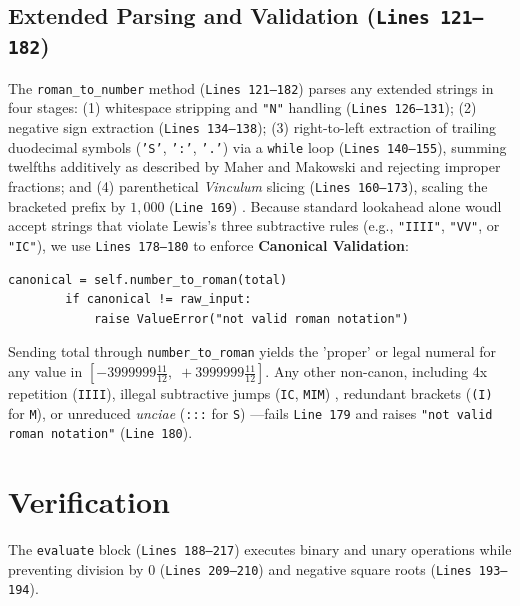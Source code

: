 \documentclass[10pt, a4paper]{article}
\begin{document}

\subsection{Extended Parsing and Validation (\texttt{Lines 121--182})}
The \texttt{roman\_to\_number} method (\texttt{Lines 121--182}) parses any extended strings in four stages: (1) whitespace stripping and \texttt{"N"} handling (\texttt{Lines 126--131}); (2) negative sign extraction (\texttt{Lines 134--138}); (3) right-to-left extraction of trailing duodecimal symbols (\texttt{'S'}, \texttt{':'}, \texttt{'.'}) via a \texttt{while} loop (\texttt{Lines 140--155}), summing twelfths additively as described by Maher and Makowski \cite{maher2001} and rejecting improper fractions; and (4) parenthetical \textit{Vinculum} slicing (\texttt{Lines 160--173}), scaling the bracketed prefix by $1,000$ (\texttt{Line 169}) \cite{lewis2019}.
\clearpage
Because standard lookahead \cite{geeksforgeeks2021} alone woudl accept strings that violate Lewis's \cite{lewis2019} three subtractive rules (e.g., \texttt{"IIII"}, \texttt{"VV"}, or \texttt{"IC"}), we use \texttt{Lines 178--180} to enforce \textbf{Canonical Validation}:

\begin{lstlisting}[style=pythonstyle]
        canonical = self.number_to_roman(total)
        if canonical != raw_input:
            raise ValueError("not valid roman notation")
\end{lstlisting}

Sending total through \texttt{number\_to\_roman} yields the 'proper' or legal numeral for any value in $[-3999999\frac{11}{12},\; +3999999\frac{11}{12}]$. Any other non-canon, including 4x repetition (\texttt{IIII}), illegal subtractive jumps (\texttt{IC}, \texttt{MIM}) \cite{lewis2019}, redundant brackets (\texttt{(I)} for \texttt{M}), or unreduced \textit{unciae} (\texttt{:::} for \texttt{S}) \cite{maher2001}---fails \texttt{Line 179} and raises \texttt{"not valid roman notation"} (\texttt{Line 180}).

\section{Verification}

The \texttt{evaluate} block (\texttt{Lines 188--217}) executes binary and unary operations while preventing division by 0 (\texttt{Lines 209--210}) and negative square roots (\texttt{Lines 193--194}).
\end{document}
